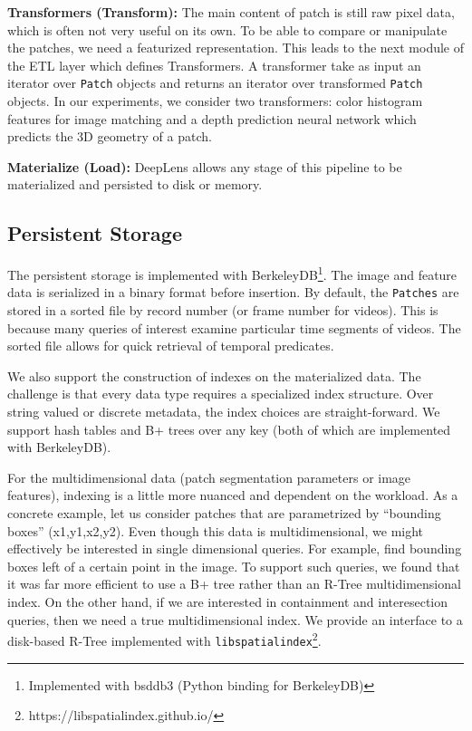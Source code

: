 \vspace{0.25em}
\noindent \textbf{Transformers (Transform): } The main content of patch is still raw pixel data, which is often not very useful on its own.
To be able to compare or manipulate the patches, we need a featurized representation.
This leads to the next module of the ETL layer which defines Transformers. 
A transformer take as input an iterator over \texttt{Patch} objects and returns an iterator over transformed \texttt{Patch} objects.  
In our experiments, we consider two transformers: color histogram features for image matching and a depth prediction neural network which predicts the 3D geometry of a patch. 

\vspace{0.25em}
\noindent \textbf{Materialize (Load): } \textsf{DeepLens} allows any stage of this pipeline to be materialized and persisted to disk or memory.

\subsection{Persistent Storage}
The persistent storage is implemented with BerkeleyDB\footnote{Implemented with bsddb3 (Python binding for BerkeleyDB)}. The image and feature data is serialized in a binary format before insertion. By default, the \texttt{Patches} are stored in a sorted file by record number (or frame number for videos). This is because many queries of interest examine particular time segments of videos.
The sorted file allows for quick retrieval of temporal predicates.

We also support the construction of indexes on the materialized data.
The challenge is that every data type requires a specialized index structure.
Over string valued or discrete metadata, the index choices are straight-forward. 
We support hash tables and B+ trees over any key (both of which are implemented with BerkeleyDB).

For the multidimensional data (patch segmentation parameters or image features), indexing is a little more nuanced and dependent on the workload.
As a concrete example, let us consider patches that are parametrized by ``bounding boxes'' (x1,y1,x2,y2).
Even though this data is multidimensional, we might effectively be interested in single dimensional queries.
For example, find bounding boxes left of a certain point in the image.
To support such queries, we found that it was far more efficient to use a B+ tree rather than an R-Tree multidimensional index.
On the other hand, if we are interested in containment and interesection queries, then we need a true multidimensional index.
We provide an interface to a disk-based R-Tree implemented with \texttt{libspatialindex}\footnote{https://libspatialindex.github.io/}.

